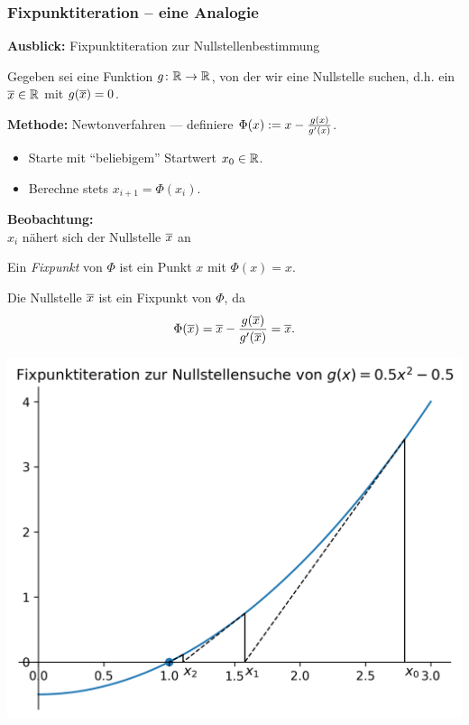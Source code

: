 \documentclass{beamer}
\begin{document}
\begin{frame} \frametitle{Fixpunktiteration -- eine Analogie}
	\small
	\textbf{Ausblick:} Fixpunktiteration zur Nullstellenbestimmung
	
	Gegeben sei eine Funktion $g \colon \mathbb{R} \to \mathbb{R}$, von der wir eine Nullstelle suchen, d.h. ein $\overline{x} \in \mathbb{R}$ mit $g(\overline{x}) = 0$.
	
	\pause
	\textbf{Methode:} Newtonverfahren --- definiere $\Phi(x) \mathrel{:=} x - \frac{g(x)}{g'(x)}$.
	\begin{itemize}
		\item Starte mit \enquote{beliebigem} Startwert $x_0 \in \mathbb{R}$.
		\item Berechne stets $x_{i+1} = \Phi(x_i)$.
	\end{itemize}

	\pause
	
	\begin{minipage}{\dimexpr0.6\linewidth-\fboxrule-\fboxsep}
		\textbf{Beobachtung:} \\
		$x_{i}$ nähert sich der Nullstelle $\overline{x}$ an
		
		\pause \smallskip
		Ein \textit{Fixpunkt} von $\Phi$ ist ein Punkt $x$ mit $\Phi(x) = x$.
		
		\pause \smallskip
		Die Nullstelle $\overline{x}$ ist ein Fixpunkt von $\Phi$, da
		\begin{equation*}
		\Phi(\overline{x}) = \overline{x} - \frac{g(\overline{x})}{g'(\overline{x})} = \overline{x} .
		\end{equation*} 
	\end{minipage}
	\pause
	\begin{minipage}{\dimexpr0.4\linewidth-\fboxrule-\fboxsep}
		\includegraphics[width=\linewidth]{../tut03/tut03_fixpunktiteration.png}
	\end{minipage}
	
\end{frame}
\end{document}
